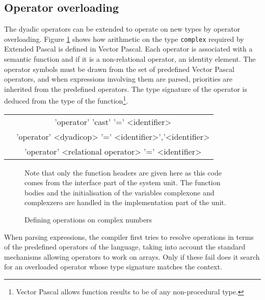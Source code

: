 {\begin{table}
\end{table}

\subsection{Operator overloading}

The dyadic operators
 can be extended to operate on new types by operator overloading.
Figure \ref{complex} shows how arithmetic on the type \texttt{complex} required
by Extended Pascal \cite{ISO90} is defined in Vector Pascal. Each operator
is associated with a semantic function and
if it is a non-relational operator,
an identity element. The operator
symbols must be drawn from the set of predefined Vector Pascal operators, and
when expressions involving them are parsed, priorities are inherited from the
predefined operators. The type signature of the operator is deduced from the
type of the function\footnote{%
Vector Pascal allows function results to be of any non-procedural type.
}. 

\vspace{0.3cm}
{\centering \begin{tabular}{|c|c|}
\hline 
{}&
{\footnotesize 'operator' 'cast' '=' <identifier>}\\
&{\footnotesize 'operator' <dyadicop> '=' <identifier>','<identifier>}\\
&{\footnotesize 'operator' <relational operator> '=' <identifier>}\\
\hline 
\end{tabular}\footnotesize \par}
\vspace{0.3cm}
\begin{figure}{\small

}
\caption{Defining operations on complex numbers}



\label{complex}{\small Note that only the function headers are given here as
this code comes from the interface part of the system unit. The function bodies
and the initialisation of the variables complexone and complexzero are handled
in the implementation part of the unit.}{\small \par}
\end{figure}
 When parsing expressions, the compiler first tries to resolve operations in
terms of the predefined operators of the language, taking into account the standard
mechanisms allowing operators to work on arrays. Only if these fail does it
search for an overloaded operator whose type signature matches the context. 

}

